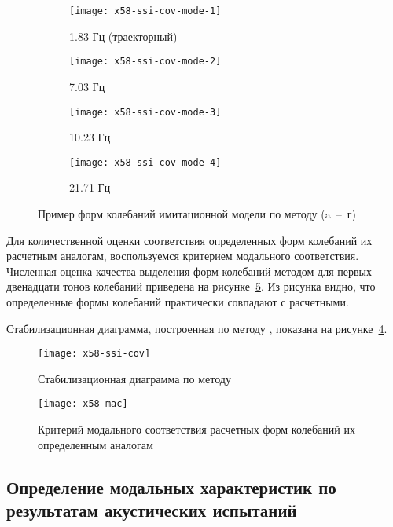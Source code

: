 \def\sfX58{0.48\textwidth}

\begin{figure}[!htb]
	\centering
	\begin{subfigure}[b]{\sfX58}
		\texttt{[image: x58-ssi-cov-mode-1]}
		\caption{1.83 Гц (траекторный)} \label{subfig:x58-ssi-cov-mode-1}
	\end{subfigure}
	\hfill
	\begin{subfigure}[b]{\sfX58}
		\texttt{[image: x58-ssi-cov-mode-2]}
		\caption{7.03 Гц}
	\end{subfigure}
	\begin{subfigure}[b]{\sfX58}
		\texttt{[image: x58-ssi-cov-mode-3]}
		\caption{10.23 Гц}
	\end{subfigure}	
	\hfill
	\begin{subfigure}[b]{\sfX58}
		\texttt{[image: x58-ssi-cov-mode-4]}
		\caption{21.71 Гц} \label{subfig:x58-ssi-cov-mode-4}
	\end{subfigure}	
	\caption{Пример форм колебаний имитационной модели по методу  (a~--~г)}
\end{figure}

Для количественной оценки соответствия определенных форм колебаний их расчетным аналогам, воспользуемся критерием модального соответствия. Численная оценка качества выделения форм колебаний методом  для первых двенадцати тонов колебаний приведена на рисунке~\ref{fig:x58-mac}. Из рисунка видно, что определенные формы колебаний практически совпадают с расчетными.

Стабилизационная диаграмма, построенная по методу , показана на рисунке~\ref{fig:x58-ssi-cov}.

\begin{figure}[H]
	\centerfloat
	\texttt{[image: x58-ssi-cov]}
	\caption{Стабилизационная диаграмма по методу } \label{fig:x58-ssi-cov}
\end{figure}

\begin{figure}[!htb]
	\centerfloat
	\texttt{[image: x58-mac]}
	\caption{Критерий модального соответствия расчетных форм колебаний их определенным аналогам} \label{fig:x58-mac}
\end{figure}

\subsection{Определение модальных характеристик по результатам акустических испытаний}

